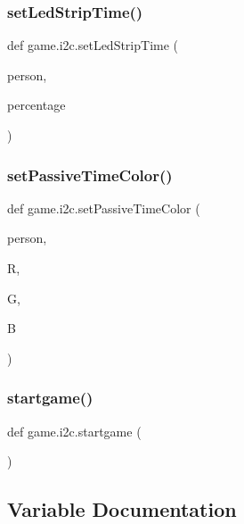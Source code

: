 \subsubsection{\texorpdfstring{set\+Led\+Strip\+Time()}{setLedStripTime()}}
{\footnotesize\ttfamily def game.\+i2c.\+set\+Led\+Strip\+Time (\begin{DoxyParamCaption}\item[{}]{person,  }\item[{}]{percentage }\end{DoxyParamCaption})}

\hypertarget{namespacegame_1_1i2c_a53e720c22085d10f15012190ea3f8ab9}{}\label{namespacegame_1_1i2c_a53e720c22085d10f15012190ea3f8ab9} 
\subsubsection{\texorpdfstring{set\+Passive\+Time\+Color()}{setPassiveTimeColor()}}
{\footnotesize\ttfamily def game.\+i2c.\+set\+Passive\+Time\+Color (\begin{DoxyParamCaption}\item[{}]{person,  }\item[{}]{R,  }\item[{}]{G,  }\item[{}]{B }\end{DoxyParamCaption})}

\hypertarget{namespacegame_1_1i2c_a3a43a96db3ce557e507f3c08617b19c5}{}\label{namespacegame_1_1i2c_a3a43a96db3ce557e507f3c08617b19c5} 
\subsubsection{\texorpdfstring{startgame()}{startgame()}}
{\footnotesize\ttfamily def game.\+i2c.\+startgame (\begin{DoxyParamCaption}{ }\end{DoxyParamCaption})}



\subsection{Variable Documentation}
\hypertarget{namespacegame_1_1i2c_a45c6bc6d1135dc398bf8deae861a2ebc}{}\label{namespacegame_1_1i2c_a45c6bc6d1135dc398bf8deae861a2ebc} 
